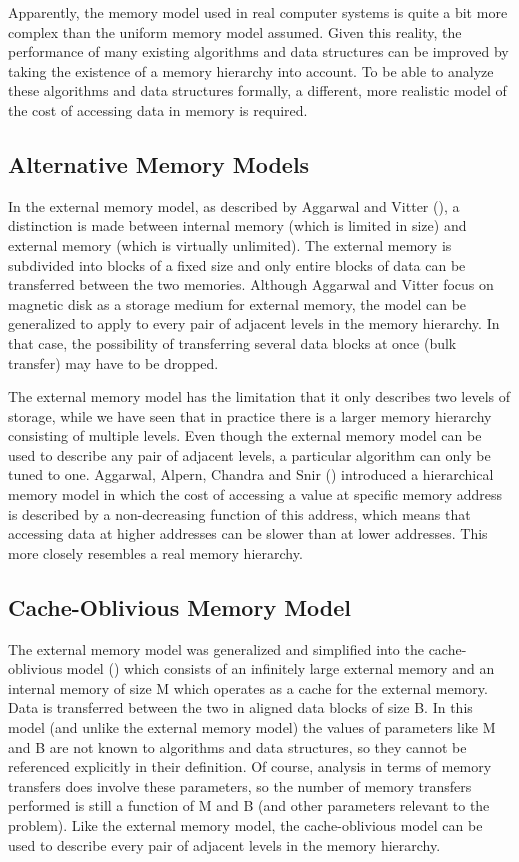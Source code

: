 \documentclass{acm_proc_article-sp}
\begin{document}

Apparently, the memory model used in real computer systems is quite a bit more complex than the uniform memory model assumed. Given this reality, the performance of many existing algorithms and data structures can be improved by taking the existence of a memory hierarchy into account. To be able to analyze these algorithms and data structures formally, a different, more realistic model of the cost of accessing data in memory is required.

\subsection{Alternative Memory Models}
In the external memory model, as described by Aggarwal and Vitter (\cite{aggarwal1988ioc}), a distinction is made between internal memory (which is limited in size) and external memory (which is virtually unlimited). The external memory is subdivided into blocks of a fixed size and only entire blocks of data can be transferred between the two memories. Although Aggarwal and Vitter focus on magnetic disk as a storage medium for external memory, the model can be generalized to apply to every pair of adjacent levels in the memory hierarchy. In that case, the possibility of transferring several data blocks at once (bulk transfer) may have to be dropped.

The external memory model has the limitation that it only describes two levels of storage, while we have seen that in practice there is a larger memory hierarchy consisting of multiple levels. Even though the external memory model can be used to describe any pair of adjacent levels, a particular algorithm can only be tuned to one. Aggarwal, Alpern, Chandra and Snir (\cite{aggarwal1987mhm}) introduced a hierarchical memory model in which the cost of accessing a value at specific memory address is described by a non-decreasing function of this address, which means that accessing data at higher addresses can be slower than at lower addresses. This more closely resembles a real memory hierarchy.

\subsection{Cache-Oblivious Memory Model}
The external memory model was generalized and simplified into the cache-oblivious model (\cite{prokop1999coa}) which consists of an infinitely large external memory and an internal memory of size M which operates as a cache for the external memory. Data is transferred between the two in aligned data blocks of size B. In this model (and unlike the external memory model) the values of parameters like M and B are not known to algorithms and data structures, so they cannot be referenced explicitly in their definition. Of course, analysis in terms of memory transfers does involve these parameters, so the number of memory transfers performed is still a function of M and B (and other parameters relevant to the problem). Like the external memory model, the cache-oblivious model can be used to describe every pair of adjacent levels in the memory hierarchy.
\end{document}
